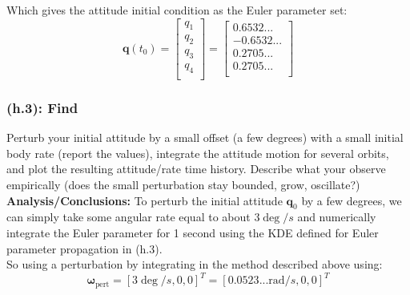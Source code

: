 \documentclass[titlepage]{article}
\begin{document}
\begin{mdframed}[linewidth=1pt, innertopmargin=10pt, innerbottommargin=10pt]
	Which gives the attitude initial condition as the Euler parameter set:
	\begin{equation}
		\boldsymbol{q}(t_0)=
		\begin{bmatrix}
			q_1 \\ q_2 \\ q_3 \\ q_4 \\
		\end{bmatrix}=
		\begin{bmatrix}
			0.6532... \\ -0.6532... \\ 0.2705... \\ 0.2705... \\
		\end{bmatrix}
	\end{equation}
\end{mdframed}

\subsubsection*{(h.3): Find}
Perturb your initial attitude by a small offset (a few degrees) with a small initial body rate (report the values), integrate the attitude motion for several orbits, and plot the resulting attitude/rate time history. Describe what your observe empirically (does the small perturbation stay bounded, grow, oscillate?)\\

\textbf{Analysis/Conclusions:}
To perturb the initial attitude $\boldsymbol{q}_0$ by a few degrees, we can simply take some angular rate equal to about $3\deg/s$ and numerically integrate the Euler parameter for 1 second using the KDE defined for Euler parameter propagation in (h.3).\\

So using a perturbation by integrating in the method described above using:
\begin{equation}
	\boldsymbol{\omega}_{\text{pert}}=[3\deg/s, 0, 0]^T=[0.0523...\text{rad}/s,0,0]^T
\end{equation}
\end{document}

